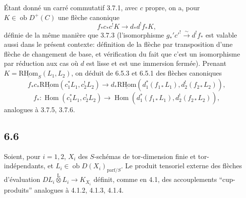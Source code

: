\documentclass[11pt]{article}
\DeclareMathOperator{\Hom}{Hom}
\newcommand{\R}{\mathrm{R}}\newcommand{\RHomCore}{\mathrm{RHom}}
\providecommand{\RHom}{\RHomCore}
\providecommand{\uRHom}{\underline{\RHom}}
\providecommand{\RHom}{\RHomCore}
\providecommand{\Hom}{\operatorname{Hom}}
\providecommand{\RHom}{\R\mathcal{H}om}
\providecommand{\R}{\mathrm R}
\providecommand{\RHom}{\RHomCore}
\providecommand{\Hom}{\operatorname{Hom}}
\begin{document}
Étant donné un carré commutatif 3.7.1, avec $c$ propre, on a, pour $K\in\operatorname{ob}D^+(C)$ une flèche canonique
\begin{equation}
\tag{6.5.3}
f_*c_*c^!K\longrightarrow d_*d^!f_*K,
\end{equation}
définie de la même manière que 3.7.3 (l'isomorphisme $g_*'c'^!\xrightarrow{\sim}d^!f_*$ est valable aussi dans le présent contexte: définition de la flèche par transposition d'une flèche de changement de base, et vérification du fait que c'est un isomorphisme par réduction aux cas où $d$ est lisse et est une immersion fermée). Prenant $K=\uRHom_S(L_1,L_2)$, on déduit de 6.5.3 et 6.5.1 des flèches canoniques
\begin{equation}
\tag{6.5.4}
f_*c_*\uRHom(c_1^*L_1,c_2^!L_2)\longrightarrow d_*\uRHom(d_1^*(f_{1*}L_1),d_2^!(f_{2*}L_2)),
\end{equation}
\begin{equation}
\tag{6.5.5}
f_*:\Hom(c_1^*L_1,c_2^!L_2)\longrightarrow\Hom(d_1^*(f_{1*}L_1),d_2^!(f_{2*}L_2)),
\end{equation}
analogues à 3.7.5, 3.7.6.

\subsection*{6.6}
Soient, pour $i=1,2$, $X_i$ des $S$-schémas de tor-dimension finie et tor-indépendants, et $L_i\in\operatorname{ob}D(X_i)_{\mathrm{parf}/S}$. Le produit tensoriel externe des flèches d'évaluation $DL_i\overset{\mathrm{L}}{\otimes}L_i\to K_{X_i}$ définit, comme en 4.1, des accouplements ``cup-produits'' analogues à 4.1.2, 4.1.3, 4.1.4.
\end{document}
